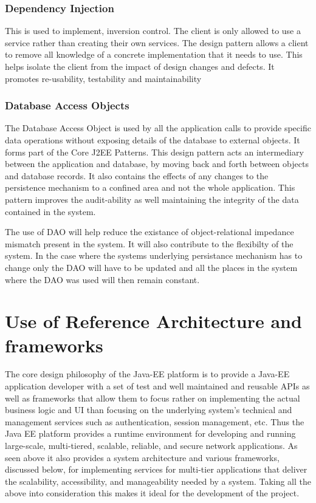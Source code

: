 \documentclass[12pt]{article}
\begin{document}
\subsubsection{Dependency Injection}
This is used to implement, inversion control. The client is only allowed to use a service rather than creating their own services. The design pattern allows a client to remove all knowledge of a concrete implementation that it needs to use. This helps isolate the client from the impact of design changes and defects. It promotes re-usability, testability and maintainability 

\subsubsection{Database Access Objects}
The Database Access Object is used by all the application calls to provide specific data operations without exposing details of the database to external objects. It forms part of the Core J2EE Patterns. This design pattern acts an intermediary between the application and database, by moving back and forth between objects and database records. It also contains the effects of any changes to the persistence mechanism to a confined area and not the whole application. This pattern improves the audit-ability as well maintaining the integrity of the data contained in the system. 

The use of DAO will help reduce the existance of object-relational impedance mismatch present in the system. It will also contribute to the flexibilty of the system. In the case where the systems underlying persistance mechanism has to change only the DAO will have to be updated and all the places in the system where the DAO was used will then remain constant.

\section{Use of Reference Architecture and frameworks}
The core design philosophy of the Java-EE platform is to provide a Java-EE application developer with a set of test and well maintained and reusable APIs as well as frameworks that allow them to focus rather on implementing the actual business logic and UI than focusing on the underlying system's technical and management services such as authentication, session management, etc. Thus the Java EE platform provides a runtime environment for developing and running large-scale, multi-tiered, scalable, reliable, and secure network applications. As seen above it also provides a system architecture and various frameworks, discussed below, for implementing services for multi-tier applications that deliver the scalability, accessibility, and manageability needed by a system. Taking all the above into consideration this makes it ideal for the development of the project.
\end{document}
